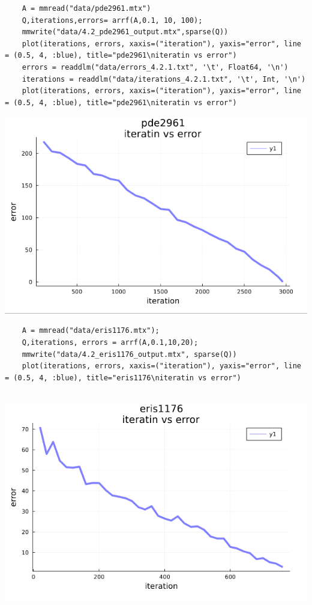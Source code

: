 \documentclass[11pt,a4paper]{article}
\theoremstyle{definition}
\begin{document}
	\begin{lstlisting}
	A = mmread("data/pde2961.mtx")
	Q,iterations,errors= arrf(A,0.1, 10, 100);
	mmwrite("data/4.2_pde2961_output.mtx",sparse(Q))
	plot(iterations, errors, xaxis=("iteration"), yaxis="error", line = (0.5, 4, :blue), title="pde2961\niteratin vs error")
	errors = readdlm("data/errors_4.2.1.txt", '\t', Float64, '\n')
	iterations = readdlm("data/iterations_4.2.1.txt", '\t', Int, '\n')
	plot(iterations, errors, xaxis=("iteration"), yaxis="error", line = (0.5, 4, :blue), title="pde2961\niteratin vs error")

	\end{lstlisting}
	\includegraphics[scale=0.5]{images/4.2_2.png}
	\begin{lstlisting}
	A = mmread("data/eris1176.mtx");
	Q,iterations, errors = arrf(A,0.1,10,20);
	mmwrite("data/4.2_eris1176_output.mtx", sparse(Q))
	plot(iterations, errors, xaxis=("iteration"), yaxis="error", line = (0.5, 4, :blue), title="eris1176\niteratin vs error")


	\end{lstlisting}
	\includegraphics[scale=0.5]{images/4.2_3.png}
\end{document}
